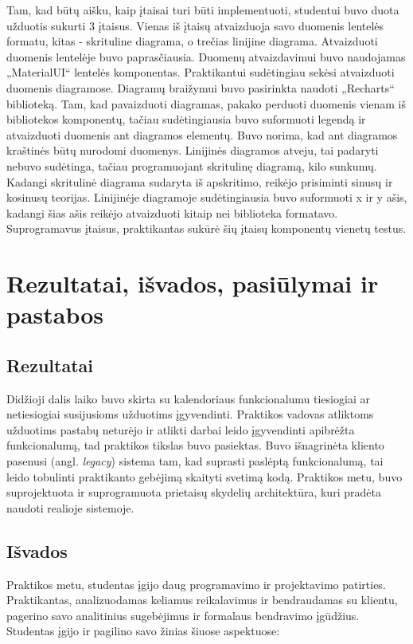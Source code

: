 \documentclass{VUMIFPSbakalaurinis}
\begin{document}
Tam, kad būtų aišku, kaip įtaisai turi būti implementuoti, studentui buvo duota užduotis sukurti 3 įtaisus. Vienas iš įtaisų atvaizduoja savo duomenis lentelės formatu, kitas - skrituline diagrama, o trečias linijine diagrama. Atvaizduoti duomenis lentelėje buvo paprasčiausia. Duomenų atvaizdavimui buvo naudojamas „MaterialUI“ lentelės komponentas. Praktikantui sudėtingiau sekėsi atvaizduoti duomenis diagramose. Diagramų braižymui buvo pasirinkta naudoti „Recharts“ biblioteką. Tam, kad pavaizduoti diagramas, pakako perduoti duomenis vienam iš bibliotekos komponentų, tačiau sudėtingiausia buvo suformuoti legendą ir atvaizduoti duomenis ant diagramos elementų. Buvo norima, kad ant diagramos kraštinės būtų nurodomi duomenys. Linijinės diagramos atveju, tai padaryti nebuvo sudėtinga, tačiau programuojant skritulinę diagramą, kilo sunkumų. Kadangi skritulinė diagrama sudaryta iš apskritimo, reikėjo prisiminti sinusų ir kosinusų teorijas. Linijinėje diagramoje sudėtingiausia buvo suformuoti x ir y ašis, kadangi šias ašis reikėjo atvaizduoti kitaip nei biblioteka formatavo. Suprogramavus įtaisus, praktikantas sukūrė šių įtaisų komponentų vienetų testus.

\section{Rezultatai, išvados, pasiūlymai ir pastabos}

\subsection{Rezultatai}
Didžioji dalis laiko buvo skirta su kalendoriaus funkcionalumu tiesiogiai ar netiesiogiai susijusioms užduotims įgyvendinti. Praktikos vadovas atliktoms užduotims pastabų neturėjo ir atlikti darbai leido įgyvendinti apibrėžta funkcionalumą, tad praktikos tikslas buvo pasiektas. Buvo išnagrinėta kliento pasenusi (angl. \textit{legacy}) sistema tam, kad suprasti paslėptą funkcionalumą, tai leido tobulinti praktikanto gebėjimą skaityti svetimą kodą. Praktikos metu, buvo suprojektuota ir suprogramuota prietaisų skydelių architektūra, kuri pradėta naudoti realioje sistemoje.

\subsection{Išvados}
Praktikos metu, studentas įgijo daug programavimo ir projektavimo patirties. Praktikantas, analizuodamas keliamus reikalavimus ir bendraudamas su klientu, pagerino savo analitinius sugebėjimus ir formalaus bendravimo įgūdžius. Studentas įgijo ir pagilino savo žinias šiuose aspektuose:
\end{document}
